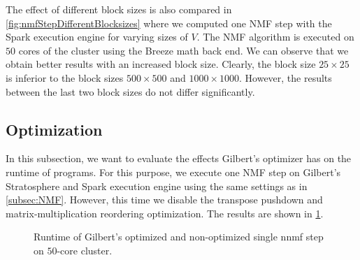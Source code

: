 The effect of different block sizes is also compared in \cref{fig:nmfStepDifferentBlocksizes} where we computed one NMF step with the Spark execution engine for varying sizes of $V$.
The NMF algorithm is executed on $50$ cores of the cluster using the Breeze math back end.
We can observe that we obtain better results with an increased block size.
Clearly, the block size $25 \times 25$ is inferior to the block sizes $500\times 500$ and $1000\times 1000$.
However, the results between the last two block sizes do not differ significantly.

\subsection{Optimization}

In this subsection, we want to evaluate the effects Gilbert's optimizer has on the runtime of programs.
For this purpose, we execute one NMF step on Gilbert's Stratosphere and Spark execution engine using the same settings as in \cref{subsec:NMF}.
However, this time we disable the transpose pushdown and matrix-multiplication reordering optimization.
The results are shown in \cref{fig:nnmfLoadOptimization}.

\begin{figure}
	\centering
	\caption{Runtime of Gilbert's optimized and non-optimized single nnmf step on $50$-core cluster.}
	\label{fig:nnmfLoadOptimization}
\end{figure}

